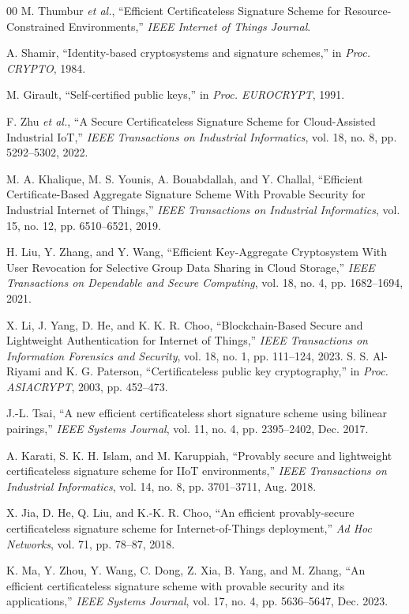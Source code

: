 \documentclass[conference]{IEEEtran}
\begin{document}
\begin{thebibliography}{00}
 M. Thumbur \textit{et al.},
``Efficient Certificateless Signature Scheme for Resource-Constrained Environments,''
\textit{IEEE Internet of Things Journal}.

 A. Shamir,
``Identity-based cryptosystems and signature schemes,''
in \textit{Proc. CRYPTO}, 1984.

 M. Girault,
``Self-certified public keys,''
in \textit{Proc. EUROCRYPT}, 1991.

 F. Zhu \textit{et al.},
``A Secure Certificateless Signature Scheme for Cloud-Assisted Industrial IoT,''
\textit{IEEE Transactions on Industrial Informatics}, vol. 18, no. 8, pp. 5292--5302, 2022.

 M. A. Khalique, M. S. Younis, A. Bouabdallah, and Y. Challal,
``Efficient Certificate-Based Aggregate Signature Scheme With Provable Security for Industrial Internet of Things,''
\textit{IEEE Transactions on Industrial Informatics}, vol. 15, no. 12, pp. 6510--6521, 2019.

 H. Liu, Y. Zhang, and Y. Wang,
``Efficient Key-Aggregate Cryptosystem With User Revocation for Selective Group Data Sharing in Cloud Storage,''
\textit{IEEE Transactions on Dependable and Secure Computing}, vol. 18, no. 4, pp. 1682--1694, 2021.

 X. Li, J. Yang, D. He, and K. K. R. Choo,
``Blockchain-Based Secure and Lightweight Authentication for Internet of Things,''
\textit{IEEE Transactions on Information Forensics and Security}, vol. 18, no. 1, pp. 111--124, 2023.
 S. S. Al-Riyami and K. G. Paterson,
``Certificateless public key cryptography,''
in \textit{Proc. ASIACRYPT}, 2003, pp. 452--473.

 J.-L. Tsai,
``A new efficient certificateless short signature scheme using bilinear pairings,''
\textit{IEEE Systems Journal}, vol. 11, no. 4, pp. 2395--2402, Dec. 2017.

 A. Karati, S. K. H. Islam, and M. Karuppiah,
``Provably secure and lightweight certificateless signature scheme for IIoT environments,''
\textit{IEEE Transactions on Industrial Informatics}, vol. 14, no. 8, pp. 3701--3711, Aug. 2018.

 X. Jia, D. He, Q. Liu, and K.-K. R. Choo,
``An efficient provably-secure certificateless signature scheme for Internet-of-Things deployment,''
\textit{Ad Hoc Networks}, vol. 71, pp. 78--87, 2018.

 K. Ma, Y. Zhou, Y. Wang, C. Dong, Z. Xia, B. Yang, and M. Zhang,
``An efficient certificateless signature scheme with provable security and its applications,''
\textit{IEEE Systems Journal}, vol. 17, no. 4, pp. 5636--5647, Dec. 2023.


\end{thebibliography}
\end{document}
